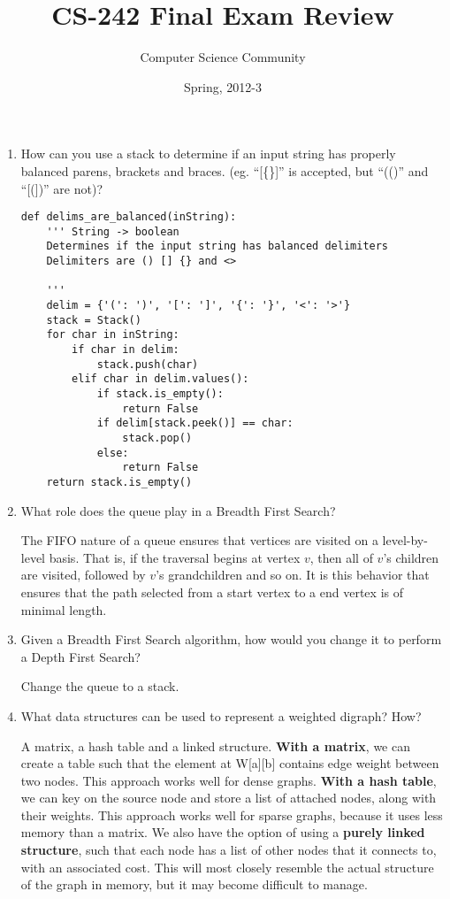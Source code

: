 \documentclass[11pt]{article}
\author{Computer Science Community}
\title{CS-242 Final Exam Review}
\date{Spring, 2012-3}
\newenvironment{answer}{\large\lstset{basicstyle=\large}\color{white}}{}
\newenvironment{answer}{\large\lstset{basicstyle=\large}\color{red}}{}
\begin{document}
\header

\begin{enumerate}

\item How can you use a stack to determine if an input string has properly
      balanced parens, brackets and braces. (eg. ``[\{\}]'' is accepted, but
      ``(()'' and ``[(])'' are not)?

    \begin{answer}
    \begin{lstlisting} 
def delims_are_balanced(inString):
    ''' String -> boolean
    Determines if the input string has balanced delimiters
    Delimiters are () [] {} and <>  
    
    '''
    delim = {'(': ')', '[': ']', '{': '}', '<': '>'}
    stack = Stack()
    for char in inString:
        if char in delim:
            stack.push(char)
        elif char in delim.values():
            if stack.is_empty():
                return False
            if delim[stack.peek()] == char:
                stack.pop()
            else:
                return False
    return stack.is_empty()
    \end{lstlisting}
    \end{answer}

\item What role does the queue play in a Breadth First Search?

    \begin{answer}
    The FIFO nature of a queue ensures that vertices are visited on a level-by-level basis. That is, if the traversal 
    begins at vertex $v$, then all of $v$'s children are visited, followed by $v$'s grandchildren and so on. It is
    this behavior that ensures that the path selected from a start vertex to a end vertex is of minimal length.
    \end{answer}

\item Given a Breadth First Search algorithm, how would you change it to
      perform a Depth First Search?

    \begin{answer}
    Change the queue to a stack.
    \end{answer}

\item What data structures can be used to represent a weighted  digraph? How?

    \begin{answer}
    A matrix, a hash table and a linked structure.
    {\bf With a matrix}, we can create a table such that the element at W[a][b]
    contains edge weight between two nodes. This approach works well for dense
    graphs.
    {\bf With a hash table}, we can key on the source node and store a list of
    attached nodes, along with their weights. This approach works well for
    sparse graphs, because it uses less memory than a matrix.
    We also have the option of using a {\bf purely linked structure}, such that
    each node has a list of other nodes that it connects to, with an associated
    cost. This will most closely resemble the actual structure of the graph in
    memory, but it may become difficult to manage.
    \end{answer}


\end{enumerate}
\end{document}
